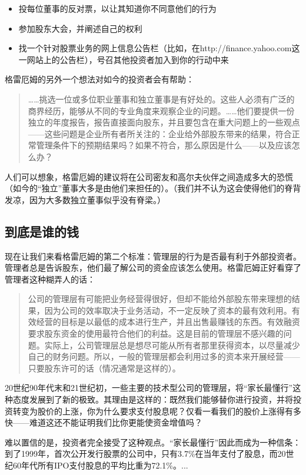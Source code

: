 \documentclass[12pt,oneside]{book}
\begin{document}
\begin{itemize}
\item 投每位董事的反对票，以让其知道你不同意他们的行为
\item 参加股东大会，并阐述自己的权利
\item 找一个针对股票业务的网上信息公告栏（比如，在http://finance.yahoo.com这一网站上的公告栏），号召其他投资者加入到你的行动中来
\end{itemize}

格雷厄姆的另外一个想法对如今的投资者会有帮助：

\begin{quote}
……挑选一位或多位职业董事和独立董事是有好处的。这些人必须有广泛的商界经历，能够从不同的专业角度来观察企业的问题。……他们要提供一份独立的年度报告，报告直接面向股东，并且要包含在重大问题上的一些观点——这些问题是企业所有者所关注的：企业给外部股东带来的结果，符合正常管理条件下的预期结果吗？如果不符合，那么原因是什么——以及应该怎么办？
\end{quote}

人们可以想象，格雷厄姆的建议将在公司密友和高尔夫伙伴之间造成多大的恐慌（如今的“独立”董事大多是由他们来担任的）。（我们并不认为这会使得他们的脊背发凉，因为大多数独立董事似乎没有脊梁。）

\subsection{到底是谁的钱}
现在让我们来看格雷厄姆的第二个标准：管理层的行为是否最有利于外部投资者。管理者总是告诉股东，他们最了解公司的资金应该怎么使用。格雷厄姆正好看穿了管理者这种糊弄人的话：

\begin{quote}
公司的管理层有可能把业务经营得很好，但却不能给外部股东带来理想的结果，因为公司的效率取决于业务活动，不一定反映了资本的最有效利用。有效经营的目标是以最低的成本进行生产，并且出售最赚钱的东西。有效融资要求股东资金的使用最符合他们的利益。这是目前的管理层不感兴趣的问题。实际上，公司管理层总是想尽可能从所有者那里获得资本，以尽量减少自己的财务问题。所以，一般的管理层都会利用过多的资本来开展经营——只要股东许可的话（情况通常是这样的）。
\end{quote}


20世纪90年代末和21世纪初，一些主要的技术型公司的管理层，将“家长最懂行”这种态度发展到了新的极致。其理由是这样的：既然我们能够替你进行投资，并将投资转变为股价的上涨，你为什么要求支付股息呢？仅看一看我们的股价上涨得有多快——难道这还不能证明我们比你更能使资金增值吗？

难以置信的是，投资者完全接受了这种观点。“家长最懂行”因此而成为一种信条：到了1999年，首次公开发行股票的公司中，只有3.7\%在当年支付了股息，而20世纪60年代所有IPO支付股息的平均比重为72.1\%。...
\end{document}
